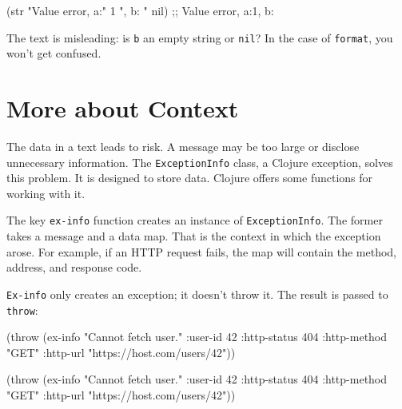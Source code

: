 \begin{english}
  \begin{clojure}
(str "Value error, a:" 1 ", b: " nil)
;; Value error, a:1, b:
  \end{clojure}
\end{english}

\noindent
The text is misleading: is \verb|b| an empty string or \verb|nil|? In the case of \verb|format|, you won't get confused.

\section{More about Context}


The data in a text leads to risk. A message may be too large or disclose unnecessary information. The \verb|ExceptionInfo| class, a Clojure exception, solves this problem. It is designed to store data. Clojure offers some functions for working with it.

The key \verb|ex-info| function creates an instance of \verb|ExceptionInfo|. The former takes a message and a data map. That is the context in which the exception arose. For example, if an HTTP request fails, the map will contain the method, address, and response code.

\verb|Ex-info| only creates an exception; it doesn't throw it. The result is passed to \verb|throw|:

\ifx\DEVICETYPE\MOBILE

\begin{english}
  \begin{clojure}
(throw (ex-info
        "Cannot fetch user."
        {:user-id 42
         :http-status 404
         :http-method "GET"
         :http-url
         "https://host.com/users/42"}))
  \end{clojure}
\end{english}

\else

\begin{english}
  \begin{clojure}
(throw (ex-info
        "Cannot fetch user."
        {:user-id 42
         :http-status 404
         :http-method "GET"
         :http-url "https://host.com/users/42"}))
  \end{clojure}
\end{english}

\fi

